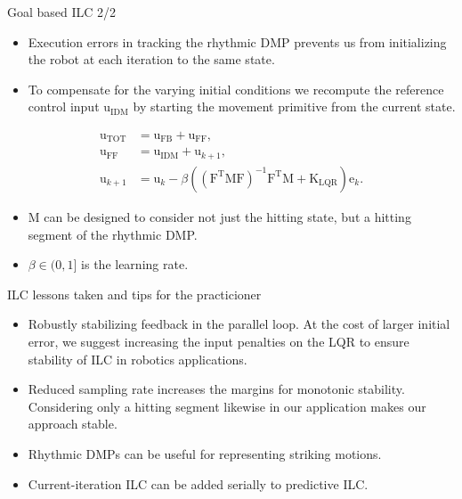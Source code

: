 \documentclass[handout]{beamer}
\newcommand{\boldvec}[1]{\boldsymbol{\mathrm{#1}}}
\let\vec\boldvec
\newcommand{\error}{\vec{e}} %
\newcommand{\sysInput}{\vec{u}} %
\begin{document}
\begin{frame}{Goal based ILC 2/2}
\begin{itemize}
\item Execution errors in tracking the rhythmic DMP prevents us from initializing the robot at each iteration to the same state.
\item To compensate for the varying initial conditions we recompute the reference control input $\sysInput_{\mathrm{IDM}}$ by starting the movement primitive from the current state.
\end{itemize}
\begin{equation}
\begin{aligned}
\sysInput_{\mathrm{TOT}} &= \sysInput_{\mathrm{FB}} + \sysInput_{\mathrm{FF}}, \\
\sysInput_{\mathrm{FF}} &= \sysInput_{\mathrm{IDM}} + \sysInput_{k+1}, \\
\sysInput_{k+1} &= \sysInput_k - \beta((\vec{F}^{\mathrm{T}}\vec{M}\vec{F})^{-1}\vec{F}^{\mathrm{T}}\vec{M} + \vec{K}_{\mathrm{LQR}})\error_{k}.
\end{aligned}
\end{equation}
\begin{itemize}
\item $\vec{M}$ can be designed to consider not just the hitting state, but
a hitting segment of the rhythmic DMP.
\item $\beta \in (0,1]$ is the learning rate.
\end{itemize}
\end{frame}
%
\begin{frame}{ILC lessons taken and tips for the practicioner}
\begin{itemize}
\item Robustly stabilizing feedback in the parallel loop. At the cost of larger initial error, we suggest increasing the input penalties on the LQR to ensure stability of ILC in robotics applications.
\item Reduced sampling rate increases the margins for monotonic stability. Considering only a hitting segment likewise in our application makes our approach stable.
\item Rhythmic DMPs can be useful for representing striking motions.
\item Current-iteration ILC can be added serially to predictive ILC.
\end{itemize}
\end{frame}
%
\end{document}
